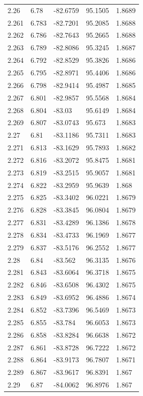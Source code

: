 \begin{tabular}{lllll}
2.26 & 6.78 & -82.6759 & 95.1505 & 1.8689 \\
2.261 & 6.783 & -82.7201 & 95.2085 & 1.8688 \\
2.262 & 6.786 & -82.7643 & 95.2665 & 1.8688 \\
2.263 & 6.789 & -82.8086 & 95.3245 & 1.8687 \\
2.264 & 6.792 & -82.8529 & 95.3826 & 1.8686 \\
2.265 & 6.795 & -82.8971 & 95.4406 & 1.8686 \\
2.266 & 6.798 & -82.9414 & 95.4987 & 1.8685 \\
2.267 & 6.801 & -82.9857 & 95.5568 & 1.8684 \\
2.268 & 6.804 & -83.03 & 95.6149 & 1.8684 \\
2.269 & 6.807 & -83.0743 & 95.673 & 1.8683 \\
2.27 & 6.81 & -83.1186 & 95.7311 & 1.8683 \\
2.271 & 6.813 & -83.1629 & 95.7893 & 1.8682 \\
2.272 & 6.816 & -83.2072 & 95.8475 & 1.8681 \\
2.273 & 6.819 & -83.2515 & 95.9057 & 1.8681 \\
2.274 & 6.822 & -83.2959 & 95.9639 & 1.868 \\
2.275 & 6.825 & -83.3402 & 96.0221 & 1.8679 \\
2.276 & 6.828 & -83.3845 & 96.0804 & 1.8679 \\
2.277 & 6.831 & -83.4289 & 96.1386 & 1.8678 \\
2.278 & 6.834 & -83.4733 & 96.1969 & 1.8677 \\
2.279 & 6.837 & -83.5176 & 96.2552 & 1.8677 \\
2.28 & 6.84 & -83.562 & 96.3135 & 1.8676 \\
2.281 & 6.843 & -83.6064 & 96.3718 & 1.8675 \\
2.282 & 6.846 & -83.6508 & 96.4302 & 1.8675 \\
2.283 & 6.849 & -83.6952 & 96.4886 & 1.8674 \\
2.284 & 6.852 & -83.7396 & 96.5469 & 1.8673 \\
2.285 & 6.855 & -83.784 & 96.6053 & 1.8673 \\
2.286 & 6.858 & -83.8284 & 96.6638 & 1.8672 \\
2.287 & 6.861 & -83.8728 & 96.7222 & 1.8672 \\
2.288 & 6.864 & -83.9173 & 96.7807 & 1.8671 \\
2.289 & 6.867 & -83.9617 & 96.8391 & 1.867 \\
2.29 & 6.87 & -84.0062 & 96.8976 & 1.867 \\

\end{tabular}
